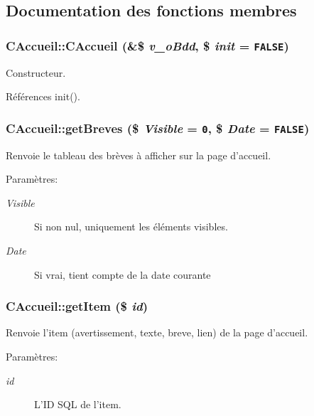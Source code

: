 \subsection{Documentation des fonctions membres}
\subsubsection{\setlength{\rightskip}{0pt plus 5cm}CAccueil::CAccueil (\&\$ {\em v\_\-oBdd}, \/  \$ {\em init} = {\tt FALSE})}\label{class_c_accueil_caecfe0673c982582da78fb654c1d11e}


Constructeur. 



Références init().
\subsubsection{\setlength{\rightskip}{0pt plus 5cm}CAccueil::getBreves (\$ {\em Visible} = {\tt 0}, \/  \$ {\em Date} = {\tt FALSE})}\label{class_c_accueil_6617e8dbf9119472d7d7e4548da12ffa}


Renvoie le tableau des brèves à afficher sur la page d'accueil. 

\begin{Desc}
\item[Paramètres:]
\begin{description}
\item[{\em Visible}]Si non nul, uniquement les éléments visibles. \item[{\em Date}]Si vrai, tient compte de la date courante \end{description}
\end{Desc}
\subsubsection{\setlength{\rightskip}{0pt plus 5cm}CAccueil::getItem (\$ {\em id})}\label{class_c_accueil_05dbb20c24dfe39dde30e9044556f47e}


Renvoie l'item (avertissement, texte, breve, lien) de la page d'accueil. 

\begin{Desc}
\item[Paramètres:]
\begin{description}
\item[{\em id}]L'ID SQL de l'item. \end{description}
\end{Desc}
